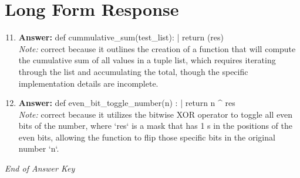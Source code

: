 \documentclass[12pt]{article}
\begin{document}
\section*{Long Form Response}
\begin{enumerate}[label=\arabic*.]
\setcounter{enumi}{10}
\item \textbf{Answer:} def cummulative\_sum(test\_list): | return (res)
\\ \textit{Note:} correct because it outlines the creation of a function that will compute the cumulative sum of all values in a tuple list, which requires iterating through the list and accumulating the total, though the specific implementation details are incomplete.
\item \textbf{Answer:} def even\_bit\_toggle\_number(n) : | return n ^ res
\\ \textit{Note:} correct because it utilizes the bitwise XOR operator to toggle all even bits of the number, where `res` is a mask that has 1 s in the positions of the even bits, allowing the function to flip those specific bits in the original number `n`.
\end{enumerate}

\vfill
\noindent\textit{End of Answer Key}
\end{document}
